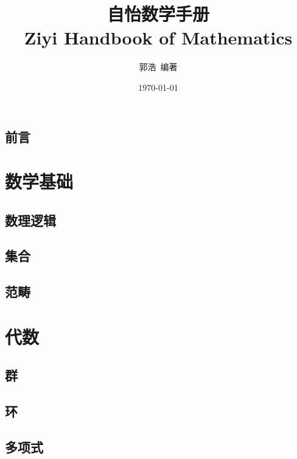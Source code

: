 \documentclass{book}
\begin{document}
\setlength{\parindent}{0em}
\Large

\title{\Huge{\textbf{自怡数学手册}} \\ \vspace{0.5cm} \huge{Ziyi Handbook of Mathematics}}  %
\author{\Large{郭浩\, 编著}} %
\date{\Large{\today}}

\maketitle
\large

\renewcommand{\contentsname}{\centerline{目录}}
\tableofcontents  %


\mainmatter %
\chapter*{前言}


\part{数学基础}
\chapter{数理逻辑}

\chapter{集合}

\chapter{范畴}

\part{代数}

\chapter{群}

\chapter{环}

\chapter{多项式}

\end{document}
